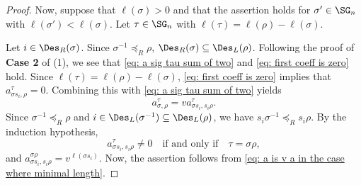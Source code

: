 \documentclass[12pt, reqno]{amsart}
\theoremstyle{plain}
\theoremstyle{definition}
\numberwithin{equation}{section}
\numberwithin{figure}{section}
\numberwithin{table}{section}
\begin{document}
\begin{proof}
Now, suppose that $\ell(\sigma) > 0$ and that the assertion holds for $\sigma' \in \SG_n$ with $\ell(\sigma') < \ell(\sigma)$.
Let $\tau \in \SG_n$ with $\ell(\tau) = \ell(\rho) - \ell(\sigma)$.

Let $i \in \Des_R(\sigma)$.
Since $\sigma^{-1} \preceq_R \rho$, $\Des_R(\sigma) \subseteq \Des_L(\rho)$.
Following the proof of {\bf Case 2} of (1), we see that \cref{eq: a sig tau sum of two} and \cref{eq: first coeff is zero} hold.
Since $\ell(\tau) = \ell(\rho) - \ell(\sigma)$, \cref{eq: first coeff is zero} implies that $a^{\tau}_{\sigma s_i, \rho} = 0$.
Combining this with \cref{eq: a sig tau sum of two} yields 
\begin{equation}\label{eq: a is v a in the case where minimal length}
a^{\tau}
_{\sigma, \rho} = v a^{\tau}_{\sigma s_i, s_i \rho}.
\end{equation}
Since $\sigma^{-1} \preceq_R \rho$ and $i \in \Des_L(\sigma^{-1}) \subseteq \Des_L(\rho)$, we have  $s_i \sigma^{-1} \preceq_R s_i \rho$.
By the induction hypothesis,
\[
a^{\tau}_{\sigma s_i, s_i \rho} \neq 0 \quad\text{if and only if}\quad \tau = \sigma \rho,
\]
and $a^{\sigma\rho}_{\sigma s_i, s_i \rho} = v^{\ell(\sigma s_i)}$.
Now, the assertion  follows from \cref{eq: a is v a in the case where minimal length}.
\end{proof}
\end{document}
